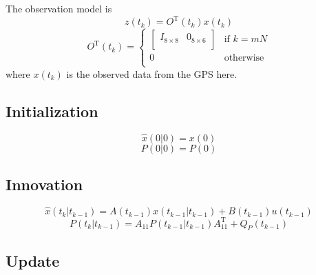 \documentclass[a4paper]{report}
\numberwithin{equation}{chapter}
\begin{document}
\bigskip

The observation model is
\begin{equation}
z \left( t_k \right) = O^{\mathrm{T}} \left( t_k \right) x \left( t_k \right)
\end{equation}
\begin{equation}
O^{\mathrm{T}} \left( t_k \right) =
\begin{cases}
\begin{bmatrix}
I_{8 \times 8} & 0_{8 \times 6}\\
\end{bmatrix} & \text{if $k = mN$}\\
0 & \text{otherwise}\\
\end{cases}
\end{equation}
where $x \left( t_k \right)$ is the observed data from the GPS here.

\subsection[Initialization]{Initialization}

\begin{equation}
\hat{x} \left( 0 | 0 \right) = x \left( 0 \right)
\end{equation}
\begin{equation}
P \left( 0 | 0 \right) = P \left( 0 \right)
\end{equation}

\subsection[Innovation]{Innovation}

\begin{equation}
\hat{x} \left( t_k | t_{k - 1} \right) = A \left( t_{k - 1} \right) \hat{x} \left( t_{k - 1} | t_{k - 1} \right) + B \left( t_{k - 1} \right) u \left( t_{k - 1} \right)
\end{equation}
\begin{equation}
P \left( t_k | t_{k - 1} \right) = A_{11} P \left( t_{k - 1} | t_{k - 1} \right) A^{\mathrm{T}}_{11} + Q_P \left( t_{k - 1} \right)
\end{equation}

\subsection[Update]{Update}
\end{document}
